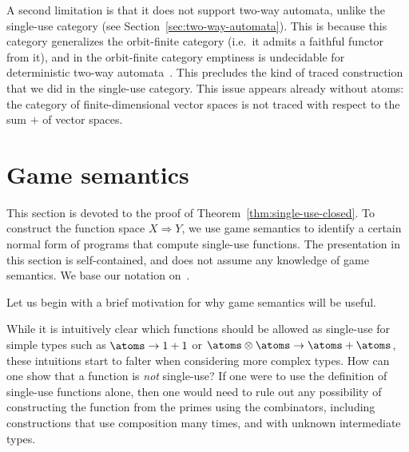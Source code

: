A second limitation is that it does not support two-way automata, unlike the single-use category (see Section~\ref{sec:two-way-automata}). This is because this category generalizes the orbit-finite category (i.e.~it admits a faithful functor from it), and in the orbit-finite category emptiness is undecidable for deterministic two-way automata~\cite[Theorem 5.3]{nevenFiniteStateMachines2004}. This precludes the kind of traced construction that we did in the single-use category. This issue appears already without atoms: the category of finite-dimensional vector spaces is not traced with respect to the sum $+$ of vector spaces. 




\appendix

\newcommand{\invar}[1]{#1_{\mathrm{in}}}
\newcommand{\outvar}[1]{#1_{\mathrm{out}}}

\section{Game semantics}
\label{sec:game-semantics}

This section is devoted to the proof of Theorem~\ref{thm:single-use-closed}. To construct the function space $X \Rightarrow Y$, we use game semantics to identify a certain normal form of programs that compute single-use functions. The presentation in this section is self-contained, and does not assume any knowledge of game semantics. We base our notation on~\cite{abramsky2013semantics}.

Let us begin with a brief motivation for why game semantics will be useful.

While it is intuitively clear which functions should be allowed as single-use for simple types such as $\atoms \to 1+1$ or $\atoms \otimes \atoms \to \atoms + \atoms$, these intuitions start to falter when considering more complex types. How can one show that a function is \emph{not} single-use? If one were to use the definition of single-use functions alone, then one would need to rule out any possibility of constructing the function from the primes using the combinators, including constructions that use composition many times, and with unknown intermediate types. 

